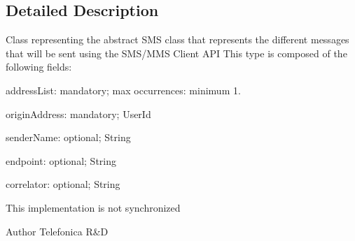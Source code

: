 \subsection{Detailed Description}
Class representing the abstract SMS class that represents the different messages that will be sent using the SMS/MMS Client API This type is composed of the following fields: 
\begin{DoxyItemize}
\item addressList: mandatory; max occurrences: minimum 1. 
\item originAddress: mandatory; UserId 
\item senderName: optional; String


\item endpoint: optional; String 
\item correlator: optional; String 
\end{DoxyItemize}

This implementation is not synchronized

\begin{DoxyAuthor}{Author}
Telefonica R\&D 
\end{DoxyAuthor}


